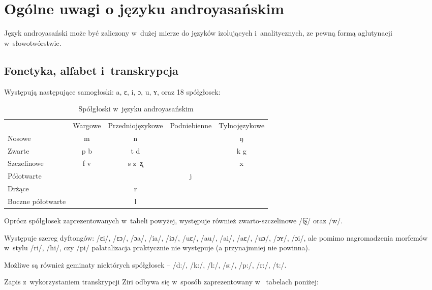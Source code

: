 \section[Ogólne uwagi]{Ogólne uwagi o języku androyasańskim}

\begin{spacing}{1.1}
Język androyasański może być zaliczony w~dużej mierze do języków 
izolujących i~analitycznych, ze pewną formą aglutynacji w~słowotwórstwie.

\subsection{Fonetyka, alfabet i~transkrypcja}

Występują następujące samogłoski: a, ɛ, i, ɔ, u, ʏ, oraz 18 spółgłosek:

\begin{table}[h]
\centering
\caption{Spółgłoski w~języku androyasańskim}
\begin{tabular}{lcccc}
                  & Wargowe & Przedniojęzykowe & Podniebienne & Tylnojęzykowe \\
Nosowe            & m       & n                &              & ŋ             \\
Zwarte            & p b     & t d              &              & k g           \\
Szczelinowe       & f v     & s z~ʐ            &              & x             \\
Półotwarte        &         &                  & j            &               \\
Drżące            &         & r                &              &               \\
Boczne półotwarte &         & l                &              &              
\end{tabular}
\label{tab:consonants}
\end{table}

Oprócz spółgłosek zaprezentowanych w~tabeli powyżej, występuje 
również zwarto-szczelinowe /t͡ʂ/ oraz /w/.

Występuje szereg dyftongów: /ɛi/, /ɛɔ/, /ɔa/, /ia/, /iɔ/, /uɛ/, /au/, /ai/, 
/aɛ/, /uɔ/, /ɔʏ/, /ɔi/, ale pomimo nagromadzenia morfemów w~stylu /ri/, /hi/, 
czy /pi/ palatalizacja praktycznie nie występuje (a przynajmniej nie powinna).

Możliwe są również geminaty niektórych spółgłosek -- /d:/, /k:/, /l:/, /s:/, 
/p:/, /r:/, /t:/.

Zapis z~wykorzystaniem transkrypcji Ziri odbywa się w~sposób zaprezentowany w~
tabelach poniżej:


\end{spacing}
